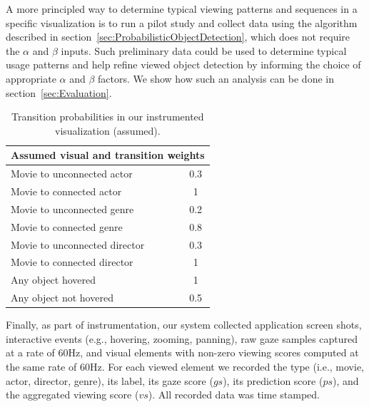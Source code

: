 A more principled way to determine typical viewing patterns and sequences in a specific visualization is to run a pilot study and collect data using the algorithm described in section~\ref{sec:ProbabilisticObjectDetection}, which does not require the $\alpha$ and $\beta$ inputs. Such preliminary data could be used to determine typical usage patterns and help refine viewed object detection by informing the choice of appropriate $\alpha$ and $\beta$ factors. We show how such an analysis can be done in section~\ref{sec:Evaluation}. 

\begin{table}[htbp]
	\centering
		\begin{tabular}{|l|c|}
			\hline
			 \multicolumn{2}{|c|}{Assumed visual and transition weights} \\ \hline
			Movie to unconnected actor & 0.3\\\hline
			Movie to connected actor & 1\\\hline
			Movie to unconnected genre & 0.2\\\hline
			Movie to connected genre & 0.8\\\hline
			Movie to unconnected director & 0.3\\\hline
			Movie to connected director & 1\\\hline
			Any object hovered & 1\\\hline
			Any object not hovered & 0.5\\
			\hline			
		\end{tabular}
	\caption{Transition probabilities in our instrumented visualization (assumed).}
	\label{tab:Transition2}
\end{table}



Finally, as part of instrumentation, our system collected application screen shots, interactive events (e.g., hovering, zooming, panning), raw gaze samples captured at a rate of $60$Hz, and visual elements with non-zero viewing scores computed at the same rate of $60$Hz. For each viewed element we recorded the type (i.e., movie, actor, director, genre), its label, its gaze score ($gs$), its prediction score ($ps$), and the aggregated viewing score ($vs$). All recorded data was time stamped. 
